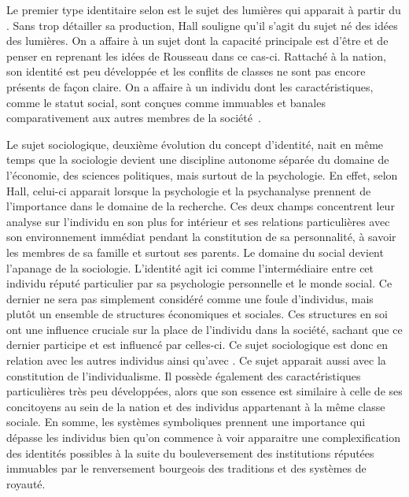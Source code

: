 Le premier type identitaire selon \citeauthor{Hall1996a} est le sujet des lumières qui apparait à partir du . 
Sans trop détailler sa production, Hall souligne qu'il s'agit du sujet né des idées des lumières. 
On a affaire à un sujet dont la capacité principale est d'être et de penser en reprenant les idées de Rousseau dans ce cas-ci. 
Rattaché à la nation, son identité est peu développée et les conflits de classes ne sont pas encore présents de façon claire. 
On a affaire à un individu dont les caractéristiques, comme le statut social, sont conçues comme immuables et banales comparativement aux autres membres de la société~\citeyearpar[596]{Hall1996a}.

Le sujet sociologique, deuxième évolution du concept d'identité, nait en même temps que la sociologie devient une discipline autonome séparée du domaine de l'économie, des sciences politiques, mais surtout de la psychologie. 
En effet, selon Hall, celui-ci apparait lorsque la psychologie et la psychanalyse prennent de l'importance dans le domaine de la recherche. 
Ces deux champs concentrent leur analyse sur l'individu en son plus for intérieur et ses relations particulières avec son environnement immédiat pendant la constitution de sa personnalité, à savoir les membres de sa famille et surtout ses parents. 
Le domaine du social devient l'apanage de la sociologie. 
L'identité agit ici comme l'intermédiaire entre cet individu réputé particulier par sa psychologie personnelle et le monde social. 
Ce dernier ne sera pas simplement considéré comme une foule d'individus, mais plutôt un ensemble de structures économiques et sociales. 
Ces structures en soi ont une influence cruciale sur la place de l'individu dans la société, sachant que ce dernier participe et est influencé par celles-ci. 
Ce sujet sociologique est donc en relation avec les autres individus ainsi qu'avec . 
Ce sujet apparait aussi avec la constitution de l'individualisme. 
Il possède également des caractéristiques particulières très peu développées, alors que son essence est similaire à celle de ses concitoyens au sein de la nation et des individus appartenant à la même classe sociale. 
En somme, les systèmes symboliques prennent une importance qui dépasse les individus bien qu'on commence à voir apparaitre une complexification des identités possibles à la suite du bouleversement des institutions réputées immuables par le renversement bourgeois des traditions et des systèmes de royauté. 

